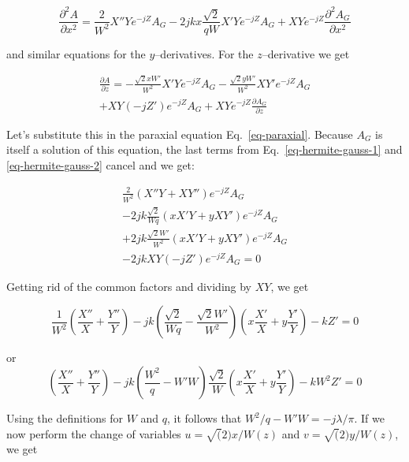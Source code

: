 \begin{equation}
\frac{\partial^2 A}{\partial x^2} = \frac{2}{W^2}X''Ye^{-jZ} A_G  - 2j k x \frac{\sqrt{2}}{qW}X'Ye^{-jZ}A_G  + XYe^{-jZ} \frac{\partial^2 A_G}{\partial x^2} \label{eq-hermite-gauss-1}
\end{equation} 

and similar equations for the $y$--derivatives. For the $z$--derivative we get

\begin{align}
\frac{\partial A}{\partial z} =  -\frac{\sqrt{2}x W'}{W^2}X'Ye^{-jZ} A_G -\frac{\sqrt{2}y W'}{W^2}XY'e^{-jZ} A_G \nonumber \\ 
+ XY\left(-jZ'\right)e^{-jZ} A_G + XYe^{-jZ}\frac{\partial A_G}{\partial z} \label{eq-hermite-gauss-2}
\end{align} 

Let's substitute this in the paraxial equation Eq.~\ref{eq-paraxial}. Because $A_G$ is itself a solution of this equation, the last terms from Eq.~\ref{eq-hermite-gauss-1} and \ref{eq-hermite-gauss-2} cancel and we get:

\begin{align}
\frac{2}{W^2}\left(X''Y+XY''\right)e^{-jZ} A_G   \nonumber \\
-2jk \frac{\sqrt{2}}{Wq}\left(xX'Y+yXY'\right)e^{-jZ}A_G \nonumber \\
+2jk \frac{\sqrt{2} W'}{W^2}\left(xX'Y+yXY'\right)e^{-jZ}A_G \nonumber \\
-2jk XY\left(-jZ'\right)e^{-jZ} A_G = 0
\end{align}

Getting rid of the common factors and dividing by $XY$, we get

\begin{equation}
\frac{1}{W^2}\left(\frac{X''}{X}+\frac{Y''}{Y}\right)  
- j k \left(\frac{\sqrt{2}}{Wq} - \frac{\sqrt{2}W'}{W^2}\right)\left(x\frac{X'}{X}+y\frac{Y'}{Y}\right)
-kZ' = 0
\end{equation} 

or
\begin{equation}
\left(\frac{X''}{X}+\frac{Y''}{Y}\right)  
- j k  \left(\frac{W^2}{q} - W'W\right)\frac{\sqrt{2}}{W}\left(x\frac{X'}{X}+y\frac{Y'}{Y}\right)
-kW^2Z' = 0
\end{equation} 

Using the definitions for $W$ and $q$, it follows that $W^2/q - W'W = -j \lambda / \pi$. If we now perform the change of variables $u = \sqrt(2) x / W(z)$ and  $v = \sqrt(2) y / W(z)$, we get

